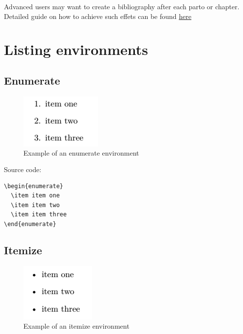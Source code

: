 Advanced users may want to create a bibliography after each parto or chapter. Detailed guide on how to achieve such effets can be found \href{https://tex.stackexchange.com/questions/229846/different-bibliographies-for-each-chapter-with-shared-references}{here}

\section{Listing environments}

\subsection{Enumerate}

\begin{figure}[H]
\centering
\includegraphics[scale=0.8]{content/LaTeX/figures/enumerate_outcome_example.png}
\caption{Example of an enumerate environment}
\label{fig:enumerate_outcome_example}
\end{figure}

Source code:

\begin{Verbatim}
\begin{enumerate}
  \item item one
  \item item two
  \item item three
\end{enumerate} 
\end{Verbatim}

\subsection{Itemize}

\begin{figure}[H]
\centering
\includegraphics[scale=0.8]{content/LaTeX/figures/itemize_outcome_example.png}
\caption{Example of an itemize environment}
\label{fig:itemize_outcome_example}
\end{figure}

